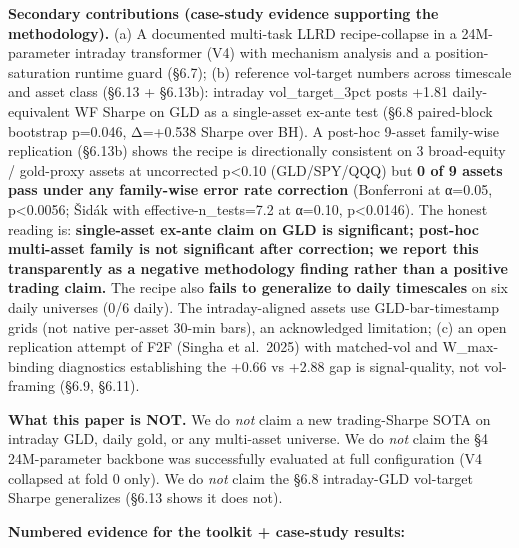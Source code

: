 \documentclass[
]{article}
\begin{document}
\textbf{Secondary contributions (case-study evidence supporting the
methodology).} (a) A documented multi-task LLRD recipe-collapse in a
24M-parameter intraday transformer (V4) with mechanism analysis and a
position-saturation runtime guard (§6.7); (b) reference vol-target
numbers across timescale and asset class (§6.13 + §6.13b): intraday
vol\_target\_3pct posts +1.81 daily-equivalent WF Sharpe on GLD as a
single-asset ex-ante test (§6.8 paired-block bootstrap p=0.046, Δ=+0.538
Sharpe over BH). A post-hoc 9-asset family-wise replication (§6.13b)
shows the recipe is directionally consistent on 3 broad-equity /
gold-proxy assets at uncorrected p\textless0.10 (GLD/SPY/QQQ) but
\textbf{0 of 9 assets pass under any family-wise error rate correction}
(Bonferroni at α=0.05, p\textless0.0056; Šidák with
effective-n\_tests=7.2 at α=0.10, p\textless0.0146). The honest reading
is: \textbf{single-asset ex-ante claim on GLD is significant; post-hoc
multi-asset family is not significant after correction; we report this
transparently as a negative methodology finding rather than a positive
trading claim.} The recipe also \textbf{fails to generalize to daily
timescales} on six daily universes (0/6 daily). The intraday-aligned
assets use GLD-bar-timestamp grids (not native per-asset 30-min bars),
an acknowledged limitation; (c) an open replication attempt of F2F
(Singha et al.~2025) with matched-vol and W\_max-binding diagnostics
establishing the +0.66 vs +2.88 gap is signal-quality, not vol-framing
(§6.9, §6.11).

\textbf{What this paper is NOT.} We do \emph{not} claim a new
trading-Sharpe SOTA on intraday GLD, daily gold, or any multi-asset
universe. We do \emph{not} claim the §4 24M-parameter backbone was
successfully evaluated at full configuration (V4 collapsed at fold 0
only). We do \emph{not} claim the §6.8 intraday-GLD vol-target Sharpe
generalizes (§6.13 shows it does not).

\textbf{Numbered evidence for the toolkit + case-study results:}
\end{document}
